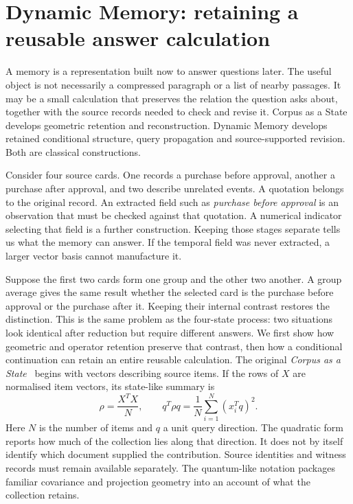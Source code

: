 \section{Dynamic Memory: retaining a reusable answer calculation}
\label{section:memory-as-a-retained-and-reconstructable-object}

A memory is a representation built now to answer questions later. The useful object is not necessarily a compressed paragraph or a list of nearby passages. It may be a small calculation that preserves the relation the question asks about, together with the source records needed to check and revise it. Corpus as a State develops geometric retention and reconstruction. Dynamic Memory develops retained conditional structure, query propagation and source-supported revision. Both are classical constructions.

Consider four source cards. One records a purchase before approval, another a purchase after approval, and two describe unrelated events. A quotation belongs to the original record. An extracted field such as \emph{purchase before approval} is an observation that must be checked against that quotation. A numerical indicator selecting that field is a further construction. Keeping those stages separate tells us what the memory can answer. If the temporal field was never extracted, a larger vector basis cannot manufacture it.

Suppose the first two cards form one group and the other two another. A group average gives the same result whether the selected card is the purchase before approval or the purchase after it. Keeping their internal contrast restores the distinction. This is the same problem as the four-state process: two situations look identical after reduction but require different answers. We first show how geometric and operator retention preserve that contrast, then how a conditional continuation can retain an entire reusable calculation.
The original \emph{Corpus as a State}~\cite{Referencece8431} begins with vectors describing source items. If the rows of $X$ are normalised item vectors, its state-like summary is
\begin{equation}
 \rho=\frac{X^T X}{N},\qquad q^T\rho q=\frac1N\sum_{i=1}^N(x_i^Tq)^2.
 \label{eq:corpus-state}
\end{equation}
Here $N$ is the number of items and $q$ a unit query direction. The quadratic form reports how much of the collection lies along that direction. It does not by itself identify which document supplied the contribution. Source identities and witness records must remain available separately. The quantum-like notation packages familiar covariance and projection geometry into an account of what the collection retains.

